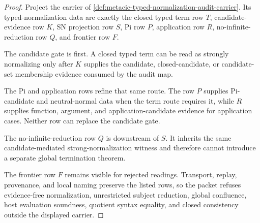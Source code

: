 \begin{proof}
Project the carrier of \autoref{def:metacic-typed-normalization-audit-carrier}. Its typed-normalization data are exactly the closed typed term row $T$, candidate-evidence row $K$, SN projection row $S$, Pi row $P$, application row $R$, no-infinite-reduction row $Q$, and frontier row $F$.

The candidate gate is first. A closed typed term can be read as strongly normalizing only after $K$ supplies the candidate, closed-candidate, or candidate-set membership evidence consumed by the audit map.

The Pi and application rows refine that same route. The row $P$ supplies Pi-candidate and neutral-normal data when the term route requires it, while $R$ supplies function, argument, and application-candidate evidence for application cases. Neither row can replace the candidate gate.

The no-infinite-reduction row $Q$ is downstream of $S$. It inherits the same candidate-mediated strong-normalization witness and therefore cannot introduce a separate global termination theorem.

The frontier row $F$ remains visible for rejected readings. Transport, replay, provenance, and local naming preserve the listed rows, so the packet refuses evidence-free normalization, unrestricted subject reduction, global confluence, host evaluation soundness, quotient syntax equality, and closed consistency outside the displayed carrier.
\end{proof}

